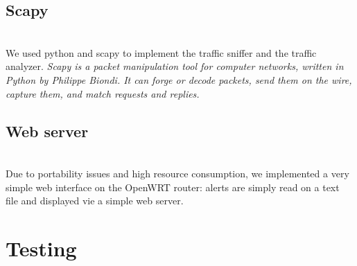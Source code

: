 \begin{frame}{}
\begin{multicols}{3}
\subsection{Scapy}\\

We used python and scapy to implement the traffic sniffer and the traffic analyzer. 
\textit{Scapy is a packet manipulation tool for computer networks, written in Python by Philippe Biondi. It can forge or decode packets, send them on the wire, capture them, and match requests and replies.}


\subsection{Web server}\\
Due to portability issues and high resource consumption, we implemented a very simple web interface on the OpenWRT router: alerts are simply read on a text file and displayed vie a simple web server.







\section{Testing}


\end{multicols}
\end{frame}
